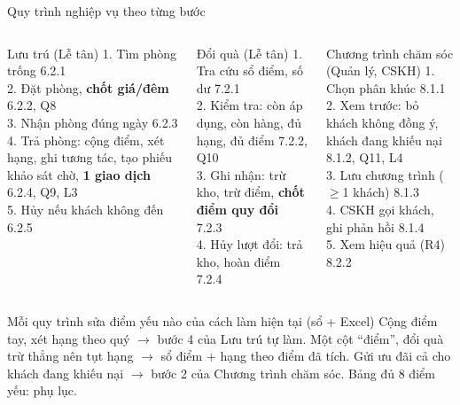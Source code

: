 \begin{frame}{Quy trình nghiệp vụ theo từng bước \TB}
\begin{columns}[T]
\begin{block}{Lưu trú (Lễ tân)}
\scriptsize
1. Tìm phòng trống \hfill\textcolor{tvB}{6.2.1}\\[0.5mm]
2. Đặt phòng, \textbf{chốt giá/đêm} \hfill\textcolor{tvB}{6.2.2, Q8}\\[0.5mm]
3. Nhận phòng đúng ngày \hfill\textcolor{tvB}{6.2.3}\\[0.5mm]
4. Trả phòng: cộng điểm, xét hạng, ghi tương tác, tạo phiếu khảo sát chờ, \textbf{1 giao dịch} \hfill\textcolor{tvB}{6.2.4, Q9, L3}\\[0.5mm]
5. Hủy nếu khách không đến \hfill\textcolor{tvB}{6.2.5}
\end{block}
\begin{block}{Đổi quà (Lễ tân)}
\scriptsize
1. Tra cứu sổ điểm, số dư \hfill\textcolor{tvB}{7.2.1}\\[0.5mm]
2. Kiểm tra: còn áp dụng, còn hàng, đủ hạng, đủ điểm \hfill\textcolor{tvB}{7.2.2, Q10}\\[0.5mm]
3. Ghi nhận: trừ kho, trừ điểm, \textbf{chốt điểm quy đổi} \hfill\textcolor{tvB}{7.2.3}\\[0.5mm]
4. Hủy lượt đổi: trả kho, hoàn điểm \hfill\textcolor{tvB}{7.2.4}
\end{block}
\begin{block}{Chương trình chăm sóc (Quản lý, CSKH)}
\scriptsize
1. Chọn phân khúc \hfill\textcolor{tvB}{8.1.1}\\[0.5mm]
2. Xem trước: bỏ khách không đồng ý, khách đang khiếu nại \hfill\textcolor{tvB}{8.1.2, Q11, L4}\\[0.5mm]
3. Lưu chương trình ($\geq$1 khách) \hfill\textcolor{tvB}{8.1.3}\\[0.5mm]
4. CSKH gọi khách, ghi phản hồi \hfill\textcolor{tvB}{8.1.4}\\[0.5mm]
5. Xem hiệu quả (R4) \hfill\textcolor{tvB}{8.2.2}
\end{block}
\end{columns}

\vspace{2mm}
\begin{alertblock}{Mỗi quy trình sửa điểm yếu nào của cách làm hiện tại (sổ + Excel)}
\scriptsize
Cộng điểm tay, xét hạng theo quý $\to$ bước 4 của Lưu trú tự làm. \quad Một cột ``điểm'', đổi quà trừ thẳng nên tụt hạng $\to$ sổ điểm + hạng theo điểm đã tích. \quad Gửi ưu đãi cả cho khách đang khiếu nại $\to$ bước 2 của Chương trình chăm sóc. Bảng đủ 8 điểm yếu: phụ lục.
\end{alertblock}
\end{frame}
